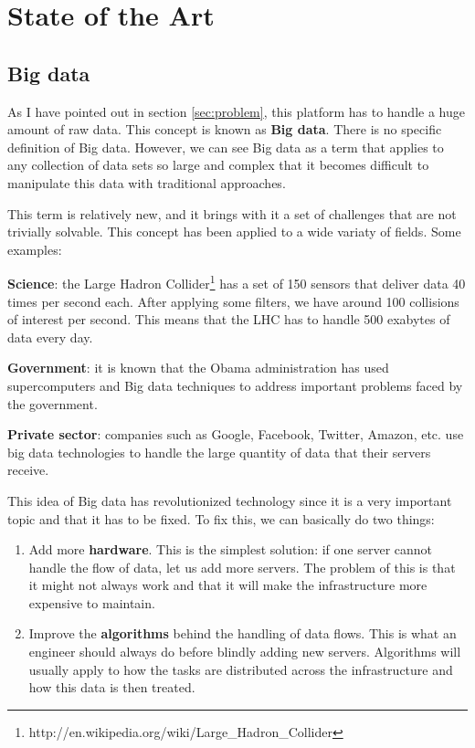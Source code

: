 
\section{State of the Art}
\label{sec:state}

\subsection{Big data}

As I have pointed out in section \ref{sec:problem}, this platform has to handle
a huge amount of raw data. This concept is known as {\bf Big data}. There is
no specific definition of Big data. However, we can see Big data as a term that
applies to any collection of data sets so large and complex that it becomes
difficult to manipulate this data with traditional approaches.

This term is relatively new, and it brings with it a set of challenges that
are not trivially solvable. This concept has been applied to a wide variaty of
fields. Some examples:

\mylist
  \item {\bf Science}: the Large Hadron
Collider\footnote{http://en.wikipedia.org/wiki/Large\_Hadron\_Collider} has a
set of 150 sensors that deliver data 40 times per second each. After applying
some filters, we have around 100 collisions of interest per second. This means
that the LHC has to handle 500 exabytes of data every day.
  \item {\bf Government}: it is known that the Obama administration has used
supercomputers and Big data techniques to address important problems faced by
the government.
  \item {\bf Private sector}: companies such as Google, Facebook, Twitter,
Amazon, etc. use big data technologies to handle the large quantity of data
that their servers receive.
\mylistend

This idea of Big data has revolutionized technology since it is a very
important topic and that it has to be fixed. To fix this, we can basically do
two things:

\begin{enumerate}
  \itemsep0em
  \item Add more {\bf hardware}. This is the simplest solution: if one server
cannot handle the flow of data, let us add more servers. The problem of this is
that it might not always work and that it will make the infrastructure more
expensive to maintain.
  \item Improve the {\bf algorithms} behind the handling of data flows. This is
what an engineer should always do before blindly adding new servers. Algorithms
will usually apply to how the tasks are distributed across the infrastructure
and how this data is then treated.
\end{enumerate}

